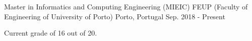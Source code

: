 
\begin{cventries}
	\cventry
		{Master in Informatics and Computing Engineering (MIEIC)}     
		{FEUP (Faculty of Engineering of University of Porto)} 
		{Porto, Portugal}                                      
		{Sep. 2018 - Present}                                  
		{
			\begin{cvitems} 
				\item {Current grade of 16 out of 20.}
			\end{cvitems}
		}
\end{cventries}
